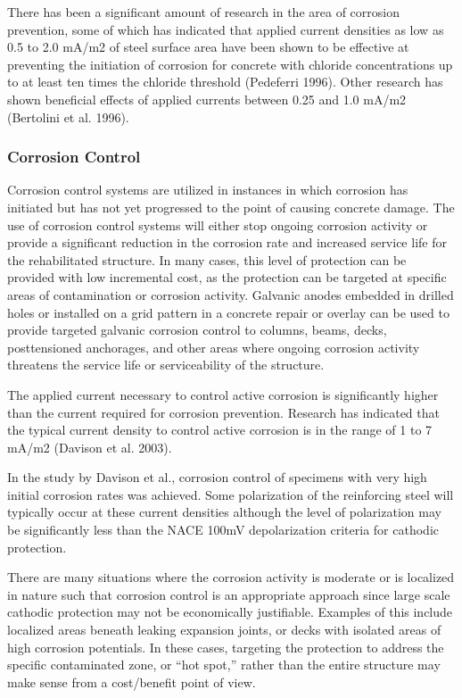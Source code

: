 There has been a significant amount of research in the area of corrosion prevention, some of which has indicated that applied current densities as low as 0.5 to 2.0 mA/m2 of steel surface area have been shown to be effective at preventing the initiation of corrosion for concrete with chloride concentrations up to at least ten times the chloride threshold (Pedeferri 1996). Other research has shown beneficial effects of applied currents between 0.25 and 1.0 mA/m2 (Bertolini et al. 1996).


\subsubsection{Corrosion Control}

Corrosion control systems are utilized in instances in which corrosion has initiated but has not yet progressed to the point of causing concrete damage. The use of corrosion control systems will either stop ongoing corrosion activity or provide a significant reduction in the corrosion rate and increased service life for the rehabilitated structure. In many cases, this level of protection can be provided with low incremental cost, as the protection can be targeted at specific areas of contamination or corrosion activity. Galvanic anodes embedded in drilled holes or installed on a grid pattern in a concrete repair or overlay can be used to provide targeted galvanic corrosion control to columns, beams, decks, posttensioned anchorages, and other areas where ongoing corrosion activity threatens the service life or serviceability of the structure. 

The applied current necessary to control active corrosion is significantly higher than the current required for corrosion prevention. Research has indicated that the typical current density to control active corrosion is in the range of 1 to 7 mA/m2 (Davison et al. 2003).

In the study by Davison et al., corrosion control of specimens with very high initial corrosion rates was achieved.  Some polarization of the reinforcing steel will typically occur at these current densities although the level of polarization may be significantly less than the NACE 100mV depolarization criteria for cathodic protection.

There are many situations where the corrosion activity is moderate or is localized in nature such that corrosion control is an appropriate approach since large scale cathodic protection may not be economically justifiable.  Examples of this include localized areas beneath leaking expansion joints, or decks with isolated areas of high corrosion potentials. In these cases, targeting the protection to address the specific contaminated zone, or “hot spot,” rather than the entire structure may make sense from a cost/benefit point of view.


